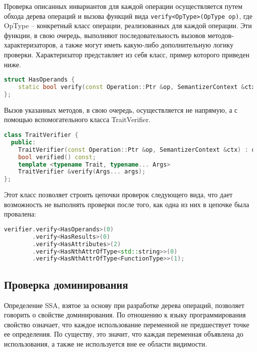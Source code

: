 Проверка описанных инвариантов для каждой операции осуществляется путем обхода дерева операций и вызова функций вида \verb|verify<OpType>(OpType op)|, где OpType -- конкретный класс операции, реализованных для каждой операции.
Эти функции, в свою очередь, выполняют последовательность вызовов методов-характеризаторов, а также могут иметь какую-либо дополнительную логику проверки.
Характеризатор представляет из себя класс, пример которого приведен ниже.

\begin{lstlisting}[language=C++, caption=Пример класса-характеризатора]
struct HasOperands {
    static bool verify(const Operation::Ptr &op, SemantizerContext &ctx, size_t numOperands);
};
\end{lstlisting}

Вызов указанных методов, в свою очередь, осуществляется не напрямую, а с помощью вспомогательного класса TraitVerifier.

\begin{lstlisting}[language=C++, caption=Интерфейс класса TraitVerifier]
class TraitVerifier {
  public:
    TraitVerifier(const Operation::Ptr &op, SemantizerContext &ctx) : op(op), ctx(ctx), acc(true){};
    bool verified() const;
    template <typename Trait, typename... Args>
    TraitVerifier &verify(Args... args);
};
\end{lstlisting}

Этот класс позволяет строить цепочки проверок следующего вида, что дает возможность не выполнять проверки после того, как одна из них в цепочке была провалена:

\begin{lstlisting}[language=C++, caption=Пример семантической верификации]
verifier.verify<HasOperands>(0)
        .verify<HasResults>(0)
        .verify<HasAttributes>(2)
        .verify<HasNthAttrOfType<std::string>>(0)
        .verify<HasNthAttrOfType<FunctionType>>(1);
\end{lstlisting}

\subsection{Проверка доминирования}

Определение SSA, взятое за основу при разработке дерева операций, позволяет говорить о свойстве доминирования.
По отношению к языку программирования свойство означает, что каждое использование переменной не предшествует точке ее определения.
По существу, это значит, что каждая переменная объявлена до использования, а также не используется вне ее области видимости.

